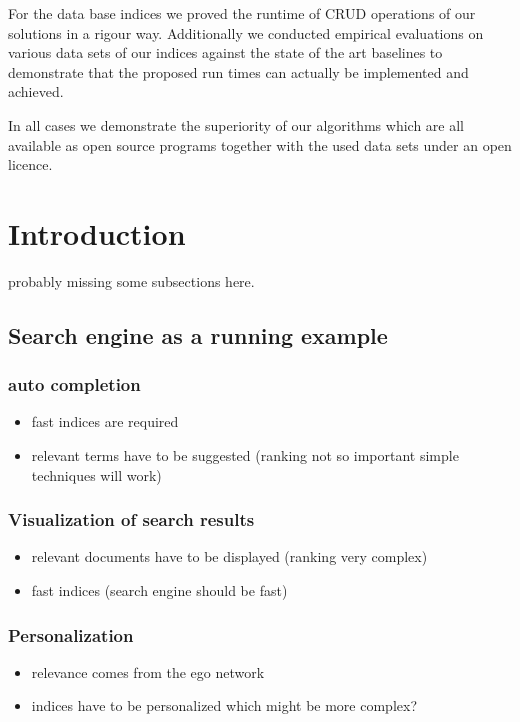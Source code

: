 \documentclass[•]{article}
\begin{document}
For the data base indices we proved the runtime of CRUD operations of our solutions in a rigour way. 
Additionally we conducted empirical evaluations on various data sets of our indices against the state of the art baselines to demonstrate that the proposed run times can actually be implemented and achieved.

In all cases we demonstrate the superiority of our algorithms which are all available as open source programs together with the used data sets under an open licence.
\pagebreak
\section{Introduction}
probably missing some subsections here.
\subsection{Search engine as a running example}
\subsubsection{auto completion}
\begin{itemize}
\item fast indices are required
\item relevant terms have to be suggested (ranking not so important simple techniques will work)
\end{itemize}

\subsubsection{Visualization of search results}
\begin{itemize}
\item relevant documents have to be displayed (ranking very complex)
\item fast indices (search engine should be fast)
\end{itemize}

\subsubsection{Personalization}
\begin{itemize}
\item relevance comes from the ego network
\item indices have to be personalized which might be more complex?
\end{itemize}
\end{document}
